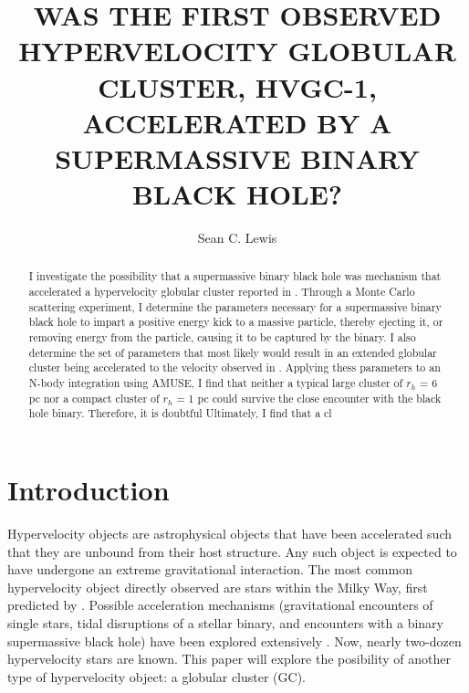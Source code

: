 \documentclass{aastex62}
\begin{document}
\title{WAS THE FIRST OBSERVED HYPERVELOCITY GLOBULAR CLUSTER, HVGC-1, ACCELERATED BY A SUPERMASSIVE BINARY BLACK HOLE?}

\author{Sean C. Lewis}



\begin{abstract}
I investigate the possibility that a supermassive binary black hole was mechanism that accelerated a hypervelocity globular cluster reported in \citet{cald14}.  Through a Monte Carlo scattering experiment, I determine the parameters necessary for a supermassive binary black hole to impart a positive energy kick to a massive particle, thereby ejecting it, or removing energy from the particle, causing it to be captured by the binary. I also determine the set of parameters that most likely would result in an extended globular cluster being accelerated to the velocity observed in \citet{cald14}. Applying thess parameters to an N-body integration using AMUSE, I find that neither a typical large cluster of  $r_{h}$ = 6 pc nor a compact cluster of $r_{h}$ = 1 pc could survive the close encounter with the black hole binary. Therefore, it is doubtful
Ultimately, I find that a cl
\end{abstract}
\section{Introduction} \label{sec:intro}
Hypervelocity objects are astrophysical objects that have been accelerated such that they are unbound from their host structure. Any such object is expected to have undergone an extreme gravitational interaction. The most common hypervelocity object directly observed are stars within the Milky Way, first predicted by \citet{hill88}.  Possible acceleration mechanisms (gravitational encounters of single stars, tidal disruptions of a stellar binary, and encounters with a binary supermassive black hole) have been explored extensively \citep{yutre03}. Now, nearly two-dozen hypervelocity stars are known. This paper will explore the posibility of another type of hypervelocity object: a globular cluster (GC). 
\end{document}
